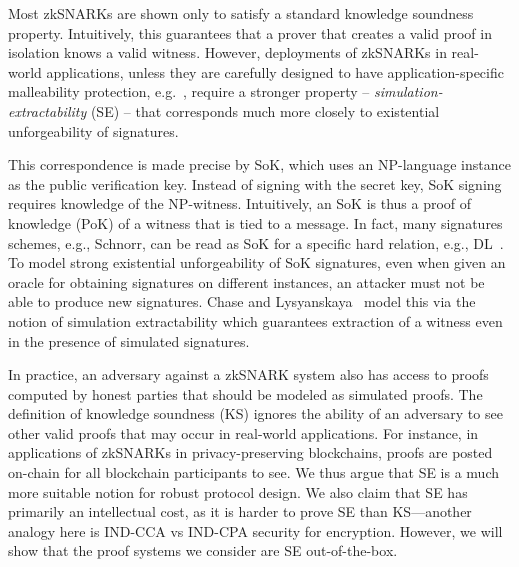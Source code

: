\documentclass[10pt]{llncs}
\begin{document}
Most zkSNARKs are shown only to satisfy a standard knowledge soundness
property. Intuitively, this guarantees that a prover that creates a valid proof in isolation knows
a valid witness. However, deployments of zkSNARKs in real-world applications, unless
they are carefully designed to have application-specific malleability protection,
e.g.~\cite{SP:BCGGMT14}, require a stronger property --
\emph{simulation-extractability} (SE) -- that corresponds much more
closely to existential unforgeability of signatures.

This correspondence is made precise by SoK, which uses an
NP-language instance as the public verification key. Instead of signing with the secret key, SoK signing requires knowledge of the
NP-witness. Intuitively, an SoK is thus a proof of knowledge (PoK) of a witness that is tied to a message. In fact, many signatures schemes, e.g., Schnorr, can be read as SoK for a specific hard relation, e.g., DL~\cite{AC:DHLW10}. To model strong existential unforgeability of SoK signatures, even
when given an oracle for obtaining signatures on different instances, an attacker
must not be able to produce new signatures. Chase and Lysyanskaya~\cite{C:ChaLys06} model this via the
notion of simulation extractability which guarantees extraction of a witness
even in the presence of simulated signatures.

In practice, an adversary against a zkSNARK system also has access to proofs computed by honest parties that should be modeled as simulated proofs. The definition of knowledge soundness (KS) ignores the ability of an adversary
to see other valid proofs that may occur in real-world applications. For instance,
in applications of zkSNARKs in privacy-preserving blockchains, proofs are posted on-chain for all blockchain participants to see. We thus argue that SE is a much more suitable notion for robust protocol design. We also claim that SE has primarily an intellectual cost, as it is harder to prove SE than KS---another analogy here is IND-CCA vs IND-CPA security for encryption. However, we will show that the proof systems we consider are SE out-of-the-box.
\end{document}
